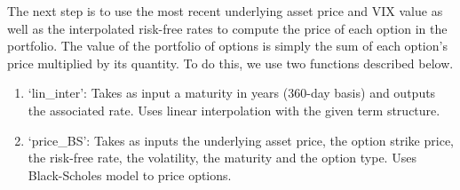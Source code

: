 \documentclass[]{article}
\providecommand{\tightlist}{%
  \setlength{\itemsep}{0pt}\setlength{\parskip}{0pt}}
\begin{document}
The next step is to use the most recent underlying asset price and VIX
value as well as the interpolated risk-free rates to compute the price
of each option in the portfolio. The value of the portfolio of options
is simply the sum of each option's price multiplied by its quantity. To
do this, we use two functions described below.

\begin{enumerate}
\def\labelenumi{\arabic{enumi}.}
\tightlist
\item
  `lin\_inter': Takes as input a maturity in years (360-day basis) and
  outputs the associated rate. Uses linear interpolation with the given
  term structure.
\item
  `price\_BS': Takes as inputs the underlying asset price, the option
  strike price, the risk-free rate, the volatility, the maturity and the
  option type. Uses Black-Scholes model to price options.
\end{enumerate}
\end{document}
